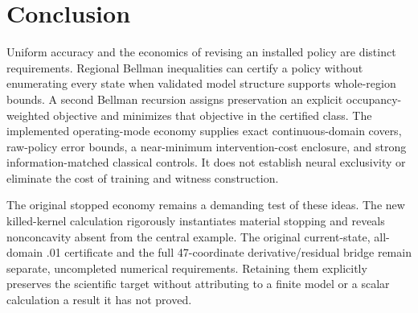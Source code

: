 \section{Conclusion}
Uniform accuracy and the economics of revising an installed policy are distinct requirements. Regional Bellman inequalities can certify a policy without enumerating every state when validated model structure supports whole-region bounds. A second Bellman recursion assigns preservation an explicit occupancy-weighted objective and minimizes that objective in the certified class. The implemented operating-mode economy supplies exact continuous-domain covers, raw-policy error bounds, a near-minimum intervention-cost enclosure, and strong information-matched classical controls. It does not establish neural exclusivity or eliminate the cost of training and witness construction.

The original stopped economy remains a demanding test of these ideas. The new killed-kernel calculation rigorously instantiates material stopping and reveals nonconcavity absent from the central example. The original current-state, all-domain .01 certificate and the full 47-coordinate derivative/residual bridge remain separate, uncompleted numerical requirements. Retaining them explicitly preserves the scientific target without attributing to a finite model or a scalar calculation a result it has not proved.
